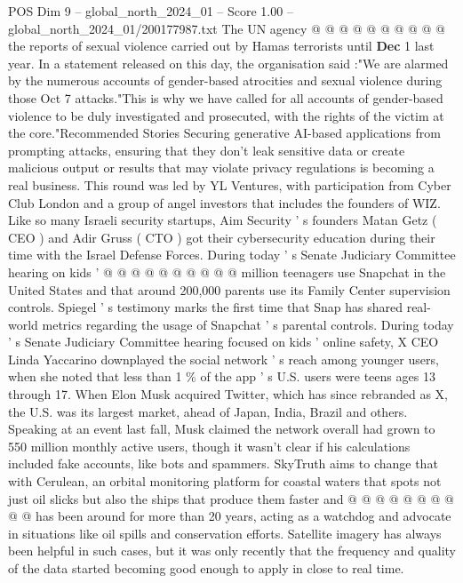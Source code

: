 \begin{textsample}{POS Dim 9 – global\_north\_2024\_01 – Score 1.00 – global\_north\_2024\_01/200177987.txt}
The UN agency @ @ @ @ @ @ @ @ @ @ the reports of sexual violence carried out by Hamas terrorists until \textbf{Dec} 1 last year.
In a statement released on this day, the organisation said :"We are alarmed by the numerous accounts of gender-based atrocities and sexual violence during those Oct 7 attacks."This is why we have called for all accounts of gender-based violence to be duly investigated and prosecuted, with the rights of the victim at the core."Recommended Stories Securing generative AI-based applications from prompting attacks, ensuring that they don't leak sensitive data or create malicious output or results that may violate privacy regulations is becoming a real business.
This round was led by YL Ventures, with participation from Cyber Club London and a group of angel investors that includes the founders of WIZ.
Like so many Israeli security startups, Aim Security ' s founders Matan Getz ( CEO ) and Adir Gruss ( CTO ) got their cybersecurity education during their time with the Israel Defense Forces.
During today ' s Senate Judiciary Committee hearing on kids ' @ @ @ @ @ @ @ @ @ @ million teenagers use Snapchat in the United States and that around 200,000 parents use its Family Center supervision controls.
Spiegel ' s testimony marks the first time that Snap has shared real-world metrics regarding the usage of Snapchat ' s parental controls.
During today ' s Senate Judiciary Committee hearing focused on kids ' online safety, X CEO Linda Yaccarino downplayed the social network ' s reach among younger users, when she noted that less than 1 \% of the app ' s U.S. users were teens ages 13 through 17.
When Elon Musk acquired Twitter, which has since rebranded as X, the U.S. was its largest market, ahead of Japan, India, Brazil and others.
Speaking at an event last fall, Musk claimed the network overall had grown to 550 million monthly active users, though it wasn't clear if his calculations included fake accounts, like bots and spammers.
SkyTruth aims to change that with Cerulean, an orbital monitoring platform for coastal waters that spots not just oil slicks but also the ships that produce them faster and @ @ @ @ @ @ @ @ @ @ has been around for more than 20 years, acting as a watchdog and advocate in situations like oil spills and conservation efforts.
Satellite imagery has always been helpful in such cases, but it was only recently that the frequency and quality of the data started becoming good enough to apply in close to real time.

\end{textsample}
